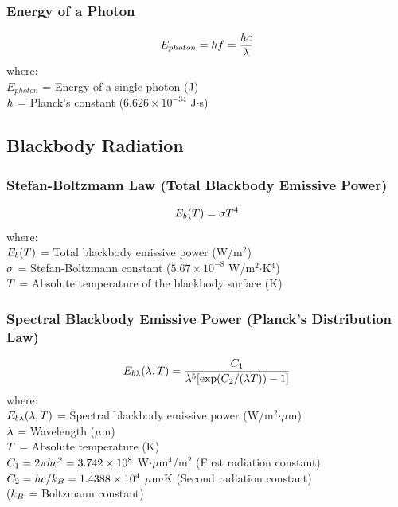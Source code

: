 \subsubsection*{Energy of a Photon}
\begin{equation}
    E_{photon} = h f = \frac{h c}{\lambda}
\end{equation}
where: \\
$E_{photon}$ = Energy of a single photon (J) \\
$h$ = Planck's constant ($6.626 \times 10^{-34}$ J$\cdot$s)

\subsection{Blackbody Radiation}
\subsubsection*{Stefan-Boltzmann Law (Total Blackbody Emissive Power)}
\begin{equation}
    E_b(T) = \sigma T^4
\end{equation}
where: \\
$E_b(T)$ = Total blackbody emissive power (W/m$^2$) \\
$\sigma$ = Stefan-Boltzmann constant ($5.67 \times 10^{-8}$ W/m$^2$$\cdot$K$^4$) \\
$T$ = Absolute temperature of the blackbody surface (K)

\subsubsection*{Spectral Blackbody Emissive Power (Planck's Distribution Law)}
\begin{equation}
    E_{b\lambda}(\lambda, T) = \frac{C_1}{\lambda^5 [\exp(C_2 / (\lambda T)) - 1]}
\end{equation}
where: \\
$E_{b\lambda}(\lambda, T)$ = Spectral blackbody emissive power (W/m$^2$$\cdot \mu$m) \\
$\lambda$ = Wavelength ($\mu$m) \\
$T$ = Absolute temperature (K) \\
$C_1 = 2\pi h c^2 = 3.742 \times 10^8$ W$\cdot \mu$m$^4$/m$^2$ (First radiation constant) \\
$C_2 = h c / k_B = 1.4388 \times 10^4$ $\mu$m$\cdot$K (Second radiation constant) \\
($k_B$ = Boltzmann constant)

